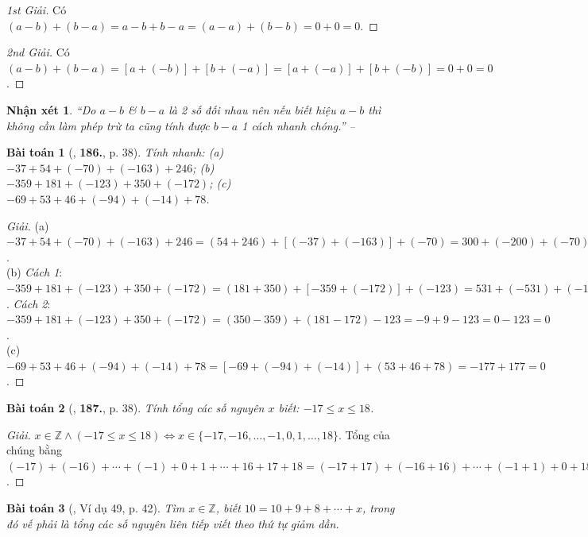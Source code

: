 \documentclass{article}
\numberwithin{equation}{section}
\newtheorem{baitoan}{Bài toán}
\newtheorem{nhanxet}{Nhận xét}[section]
\begin{document}
\begin{proof}[1st Giải]
	Có $(a - b) + (b - a) = a - b + b - a = (a - a) + (b - b) = 0 + 0 = 0$.
\end{proof}

\begin{proof}[2nd Giải]
	Có $(a - b) + (b - a) = [a + (-b)] + [b + (-a)] = [a + (-a)] + [b + (-b)] = 0 + 0 = 0$.
\end{proof}

\begin{nhanxet}
	``Do $a - b$ \& $b - a$ là 2 số đối nhau nên nếu biết hiệu $a - b$ thì không cần làm phép trừ ta cũng tính được $b - a$ 1 cách nhanh chóng.'' -- \cite[p. 38]{Tuyen_Toan_6}
\end{nhanxet}

\begin{baitoan}[\cite{Tuyen_Toan_6}, \textbf{186.}, p. 38]
	Tính nhanh: (a) $-37 + 54 + (-70) + (-163) + 246$; (b) $-359 + 181 + (-123) + 350 + (-172)$; (c) $-69 + 53 + 46 + (-94) + (-14) + 78$.
\end{baitoan}

\begin{proof}[Giải]
	(a) $-37 + 54 + (-70) + (-163) + 246 = (54 + 246) + [(-37) + (-163)] + (-70) = 300 + (-200) + (-70) = 100 - 70 = 30$.\\(b) \textit{Cách 1}: $-359 + 181 + (-123) + 350 + (-172) = (181 + 350) + [-359 + (-172)] + (-123) = 531 + (-531) + (-123) = 0 - 123 = -123$. \textit{Cách 2}: $-359 + 181 + (-123) + 350 + (-172) = (350 - 359) + (181 - 172) - 123 = -9 + 9 - 123 = 0 - 123 = 0$.\\(c) $-69 + 53 + 46 + (-94) + (-14) + 78 = [-69 + (-94) + (-14)] + (53 + 46 + 78) = -177 + 177 = 0$.
\end{proof}

\begin{baitoan}[\cite{Tuyen_Toan_6}, \textbf{187.}, p. 38]
	Tính tổng các số nguyên $x$ biết: $-17\le x\le18$.
\end{baitoan}

\begin{proof}[Giải]
	$x\in\mathbb{Z}\land(-17\le x\le18)\Leftrightarrow x\in\{-17,-16,\ldots,-1,0,1,\ldots,18\}$. Tổng của chúng bằng $(-17) + (-16) + \cdots + (-1) + 0 + 1 + \cdots + 16 + 17 + 18 = (-17 + 17) + (-16 + 16) + \cdots + (-1 + 1) + 0 + 18 = 0 + 0 + \cdots + 0 + 0 + 18 = 18$. 
\end{proof}

\begin{baitoan}[\cite{Binh_Toan_6_tap_1}, Ví dụ 49, p. 42]
	Tìm $x\in\mathbb{Z}$, biết $10 = 10 + 9 + 8 + \cdots + x$, trong đó vế phải là tổng các số nguyên liên tiếp viết theo thứ tự giảm dần.
\end{baitoan}
\end{document}
